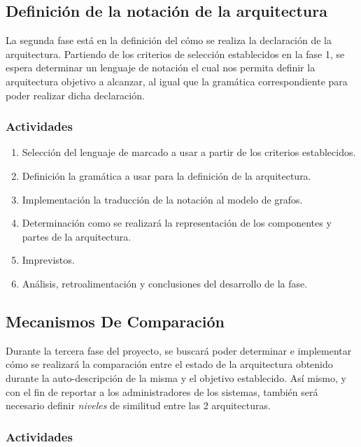 \documentclass[12pt]{article}
\begin{document}
    \subsection{Definición de la notación de la arquitectura}
    
    La segunda fase está en la definición del cómo se realiza la declaración de la arquitectura. Partiendo de los criterios de selección establecidos en la fase 1, se espera determinar un lenguaje de notación el cual nos permita definir la arquitectura objetivo a alcanzar, al igual que la gramática correspondiente para poder realizar dicha declaración. 
    
    \subsubsection*{Actividades}

    \begin{enumerate}[label=\thesubsection.\arabic*., wide, labelindent=2em, leftmargin=5em]
        \item Selección del lenguaje de marcado a usar a partir de los criterios establecidos.
        \item Definición la gramática a usar para la definición de la arquitectura.
        \item Implementación la traducción de la notación al modelo de grafos. %
        \item Determinación como se realizará la representación de los componentes y partes de la arquitectura.
        \item Imprevistos.
        \item Análisis, retroalimentación y conclusiones del desarrollo de la fase. 
    \end{enumerate}    

    \subsection{Mecanismos De Comparación}

    Durante la tercera fase del proyecto, se buscará poder determinar e implementar cómo se realizará la comparación entre el estado de la arquitectura obtenido durante la auto-descripción de la misma y el objetivo establecido. Así mismo, y con el fin de reportar a los administradores de los sistemas, también será necesario definir \textit{niveles} de similitud entre las 2 arquitecturas.

    \subsubsection*{Actividades}
\end{document}
